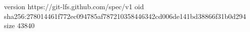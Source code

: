 version https://git-lfs.github.com/spec/v1
oid sha256:278014461f772ec094785af787210358446342cd006de141bd38866f31b0d294
size 43840

